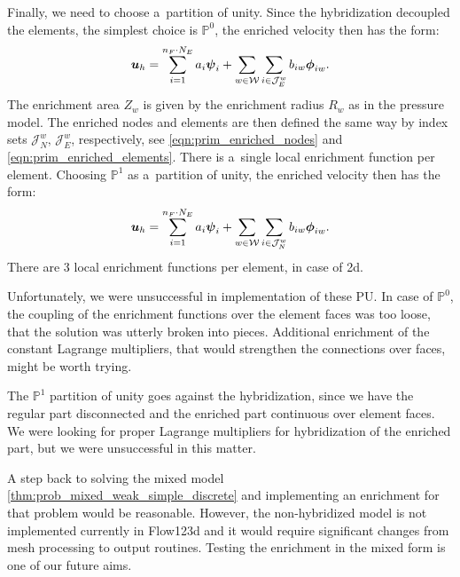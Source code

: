 Finally, we need to choose a~partition of unity. Since the hybridization decoupled the elements,
the simplest choice is $\mathbb P^0$, 
the enriched velocity then has the form:
\begin{equation}
    \mathbf{\boldsymbol{u}}_h = 
    \sum \limits_{i=1}^{n_F\cdot N_E} a_i \mathbf{\boldsymbol{\psi}}_i + 
    \sum \limits_{w\in\mathcal{W}} \sum \limits_{i\in\mathcal{J}^w_E} b_{iw} \mathbf{\boldsymbol{\phi}}_{iw}.
\end{equation}
The enrichment area $Z_w$ is given by the enrichment radius $R_w$ as in the pressure model.
The enriched nodes and elements are then defined the same way by index sets $\mathcal{J}^w_N,\,\mathcal{J}^w_E$, respectively,
see \eqref{eqn:prim_enriched_nodes} and \eqref{eqn:prim_enriched_elements}.
There is a~single local enrichment function per element.
Choosing $\mathbb P^1$ as a~partition of unity,
the enriched velocity then has the form:
\begin{equation}
    \mathbf{\boldsymbol{u}}_h = 
    \sum \limits_{i=1}^{n_F\cdot N_E} a_i \mathbf{\boldsymbol{\psi}}_i + 
    \sum \limits_{w\in\mathcal{W}} \sum \limits_{i\in\mathcal{J}^w_N} b_{iw} \mathbf{\boldsymbol{\phi}}_{iw}.
\end{equation}
There are 3 local enrichment functions per element, in case of 2d.

Unfortunately, we were unsuccessful in implementation of these PU.
In case of $\mathbb P^0$, the coupling of the enrichment functions over the element faces was too loose,
that the solution was utterly broken into pieces.
Additional enrichment of the constant Lagrange multipliers, that would strengthen the connections over faces,
might be worth trying.

The $\mathbb P^1$ partition of unity goes against the hybridization, since we have the regular part disconnected
and the enriched part continuous over element faces. We were looking for proper Lagrange multipliers
for hybridization of the enriched part, but we were unsuccessful in this matter.

A step back to solving the mixed model \ref{thm:prob_mixed_weak_simple_discrete} and implementing an enrichment
for that problem would be reasonable. However, the non-hybridized model is not implemented currently in Flow123d
and it would require significant changes from mesh processing to output routines.
Testing the enrichment in the mixed form is one of our future aims.


